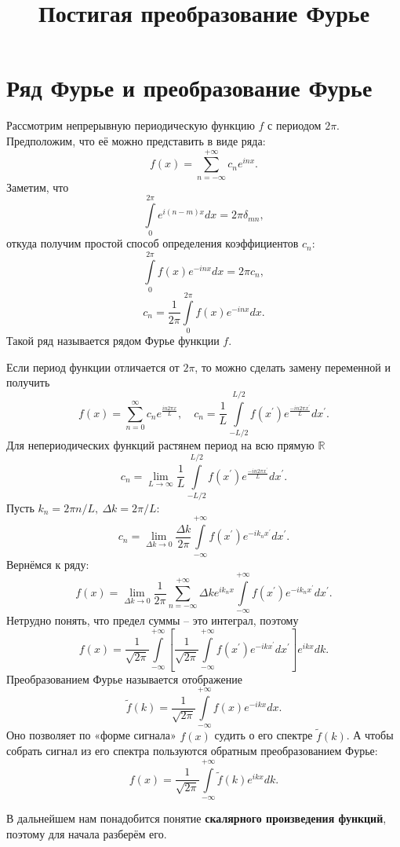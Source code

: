 \documentclass{ncc}
\title{Постигая преобразование Фурье}
\begin{document}
\maketitle
\tableofcontents
\section{Ряд Фурье и преобразование Фурье}
Рассмотрим непрерывную периодическую функцию \( f \) с периодом \( 2\pi \).
Предположим, что её можно представить в виде ряда:
\[
    f(x) = \sum\limits_{n=-\infty}^{+\infty} c_n e^{inx}.
\]
Заметим, что
\[
    \int\limits_0^{2\pi} e^{i(n-m)x} dx = 2\pi\delta_{mn},
\]
откуда получим простой способ определения коэффициентов \( c_n \):
\[
    \int\limits_0^{2\pi} f(x) e^{-inx} dx = 2\pi c_n,
\]
\[
    c_n = \frac{1}{2\pi}\int\limits_0^{2\pi} f(x) e^{-inx} dx.
\]
Такой ряд называется рядом Фурье функции \( f \).

Если период функции отличается от \( 2\pi \), то можно сделать замену
переменной и получить
\[
    f(x) = \sum\limits_{n=0}^\infty c_n e^\frac{in2\pi x}{L},\quad
    c_n = \frac{1}{L}\int\limits_{-L/2}^{L/2} f(x^\prime) e^\frac{-in2\pi x^\prime}{L} dx^\prime.
\]
Для непериодических функций растянем период на всю прямую \( \mathbb{R} \)
\[
   c_n = \lim_{L\to\infty} \frac{1}{L}\int\limits_{-L/2}^{L/2} f(x^\prime) e^\frac{-in2\pi x^\prime}{L} dx^\prime.
\]
Пусть \( k_n = 2\pi n / L,\ \Delta k = 2\pi / L \):
\[
   c_n = \lim_{\Delta k \to 0} \frac{\Delta k}{2\pi}\int\limits_{-\infty}^{+\infty} f(x^\prime) e^{-ik_nx^\prime} dx^\prime.
\]
Вернёмся к ряду:
\[
    f(x) = \lim_{\Delta k\to 0}\frac{1}{2\pi}\sum\limits_{n=-\infty}^{+\infty} \Delta k
    e^{ik_nx}\int\limits_{-\infty}^{+\infty} f(x^\prime) e^{-ik_nx^\prime}
    dx^\prime.
\]
Нетрудно понять, что предел суммы -- это интеграл, поэтому
\[
    f(x) = \frac{1}{\sqrt{2\pi}}\int\limits_{-\infty}^{+\infty}  \left[\frac{1}{\sqrt{2\pi}}\int\limits_{-\infty}^{+\infty} f(x^\prime) e^{-ikx^\prime} dx^\prime\right] e^{ikx} dk.
\]
Преобразованием Фурье называется отображение
\[
    \tilde{f}(k) = \frac{1}{\sqrt{2\pi}}\int\limits_{-\infty}^{+\infty} f(x) e^{-ikx} dx.
\]
Оно позволяет по «форме сигнала» \(f(x)\) судить о его спектре
\(\tilde{f}(k)\). А чтобы собрать сигнал из его спектра пользуются обратным
преобразованием Фурье:
\[
    f(x) = \frac{1}{\sqrt{2\pi}}\int\limits_{-\infty}^{+\infty} \tilde{f}(k) e^{ikx} dk.
\]

В дальнейшем нам понадобится понятие \textbf{скалярного произведения функций}, поэтому
для начала разберём его.
\end{document}
